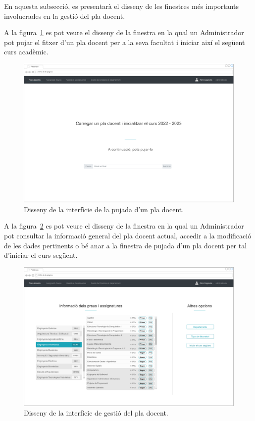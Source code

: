 \documentclass[a4paper,12pt]{ThesisStyle}
\begin{document}
En aquesta subsecció, es presentarà el disseny de les finestres més importants involucrades en la gestió del pla docent.

A la figura~\ref{img:plaDocent_pujada} es pot veure el disseny de la finestra en la qual un Administrador pot pujar el fitxer d'un pla docent per a la seva facultat i iniciar així el següent curs acadèmic. 

\begin{figure}[H]
	\centering
	\includegraphics[width=\textwidth]{assets/interfaces/plaDocent/pujada.pdf}
	\caption{\label{img:plaDocent_pujada}Disseny de la interfície de la pujada d'un pla docent.}
\end{figure}

\newpage

A la figura~\ref{img:plaDocent_general} es pot veure el disseny de la finestra en la qual un Administrador pot consultar la informació general del pla docent actual, accedir a la modificació de les dades pertinents o bé anar a la finestra de pujada d'un pla docent per tal d'iniciar el curs següent.

\begin{figure}[H]
	\centering
	\includegraphics[width=\textwidth]{assets/interfaces/plaDocent/general.pdf}
	\caption{\label{img:plaDocent_general}Disseny de la interfície de gestió del pla docent.}
\end{figure}
\end{document}
